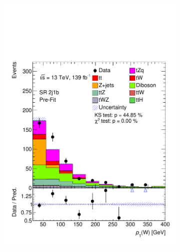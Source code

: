 \begin{figure}[!h]
\begin{subfigure}[b]{0.33\linewidth}
    \includegraphics[width=\linewidth]{ubonn-thesis/Chapters/Chapters_06/Figure/Input_distribution/SR_2j1b_W_pt.pdf} 
  \end{subfigure}%
  \newline
  \begin{subfigure}[b]{0.33\linewidth}
    \centering

\end{subfigure}
\end{figure}
